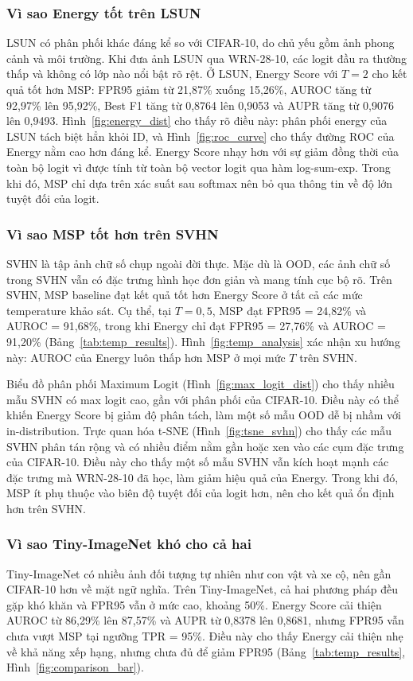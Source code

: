 \documentclass[12pt,a4paper]{article}
\begin{document}
\subsubsection{Vì sao Energy tốt trên LSUN}
LSUN có phân phối khác đáng kể so với CIFAR-10, do chủ yếu gồm ảnh phong cảnh và môi trường. Khi đưa ảnh LSUN qua WRN-28-10, các logit đầu ra thường thấp và không có lớp nào nổi bật rõ rệt.
Ở LSUN, Energy Score với $T = 2$ cho kết quả tốt hơn MSP: FPR95 giảm từ 21,87\% xuống 15,26\%, AUROC tăng từ 92,97\% lên 95,92\%, Best F1 tăng từ 0,8764 lên 0,9053 và AUPR tăng từ 0,9076 lên 0,9493. Hình~\ref{fig:energy_dist} cho thấy rõ điều này: phân phối energy của LSUN tách biệt hẳn khỏi ID, và Hình~\ref{fig:roc_curve} cho thấy đường ROC của Energy nằm cao hơn đáng kể.
Energy Score nhạy hơn với sự giảm đồng thời của toàn bộ logit vì được tính từ toàn bộ vector logit qua hàm log-sum-exp. Trong khi đó, MSP chỉ dựa trên xác suất sau softmax nên bỏ qua thông tin về độ lớn tuyệt đối của logit.

\subsubsection{Vì sao MSP tốt hơn trên SVHN}
SVHN là tập ảnh chữ số chụp ngoài đời thực. Mặc dù là OOD, các ảnh chữ số trong SVHN vẫn có đặc trưng hình học đơn giản và mang tính cục bộ rõ.
Trên SVHN, MSP baseline đạt kết quả tốt hơn Energy Score ở tất cả các mức temperature khảo sát. Cụ thể, tại $T=0{,}5$, MSP đạt FPR95 = 24,82\% và AUROC = 91,68\%, trong khi Energy chỉ đạt FPR95 = 27,76\% và AUROC = 91,20\% (Bảng~\ref{tab:temp_results}). Hình~\ref{fig:temp_analysis} xác nhận xu hướng này: AUROC của Energy luôn thấp hơn MSP ở mọi mức $T$ trên SVHN.

Biểu đồ phân phối Maximum Logit (Hình~\ref{fig:max_logit_dist}) cho thấy nhiều mẫu SVHN có max logit cao, gần với phân phối của CIFAR-10. Điều này có thể khiến Energy Score bị giảm độ phân tách, làm một số mẫu OOD dễ bị nhầm với in-distribution. Trực quan hóa t-SNE (Hình~\ref{fig:tsne_svhn}) cho thấy các mẫu SVHN phân tán rộng và có nhiều điểm nằm gần hoặc xen vào các cụm đặc trưng của CIFAR-10. Điều này cho thấy một số mẫu SVHN vẫn kích hoạt mạnh các đặc trưng mà WRN-28-10 đã học, làm giảm hiệu quả của Energy. Trong khi đó, MSP ít phụ thuộc vào biên độ tuyệt đối của logit hơn, nên cho kết quả ổn định hơn trên SVHN.

\subsubsection{Vì sao Tiny-ImageNet khó cho cả hai}
Tiny-ImageNet có nhiều ảnh đối tượng tự nhiên như con vật và xe cộ, nên gần CIFAR-10 hơn về mặt ngữ nghĩa.
Trên Tiny-ImageNet, cả hai phương pháp đều gặp khó khăn và FPR95 vẫn ở mức cao, khoảng 50\%. Energy Score cải thiện AUROC từ 86,29\% lên 87,57\% và AUPR từ 0,8378 lên 0,8681, nhưng FPR95 vẫn chưa vượt MSP tại ngưỡng TPR = 95\%. Điều này cho thấy Energy cải thiện nhẹ về khả năng xếp hạng, nhưng chưa đủ để giảm FPR95 (Bảng~\ref{tab:temp_results}, Hình~\ref{fig:comparison_bar}).
\end{document}
